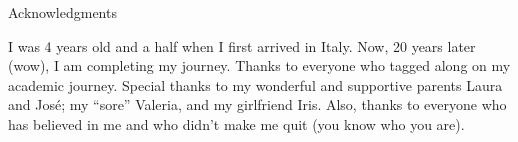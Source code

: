 \thispagestyle{empty}

\vspace*{20mm}

\begin{center}
{ Acknowledgments}
\end{center}

\vspace{10mm}

I was 4 years old and a half when I first arrived in Italy. Now, 20 years later (wow), I am completing my journey.
Thanks to everyone who tagged along on my academic journey.
Special thanks to my wonderful and supportive parents Laura and José; my ``sore'' Valeria, and my girlfriend Iris.
Also, thanks to everyone who has believed in me and who didn't make me quit (you know who you are).

\cleardoublepage{}
